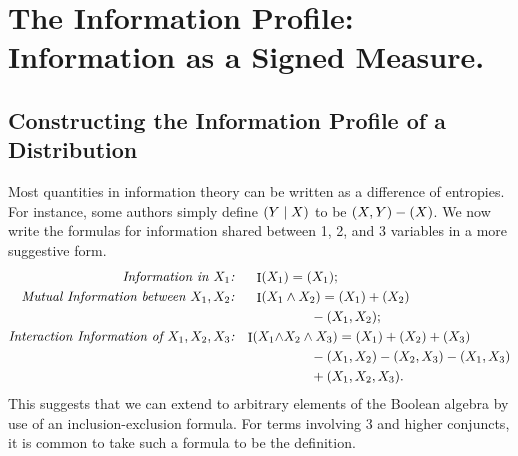 \documentclass{article}
\theoremstyle{plain}
\theoremstyle{definition}
\theoremstyle{remark}
\let\H\relax
\DeclareMathOperator{\H}{\mathrm{H}} %
\DeclareMathOperator{\I}{\mathrm{I}} %
\begin{document}
	
	\section{The Information Profile: Information as a Signed Measure.}
	
	

	


	\subsection{Constructing the Information Profile of a Distribution}
		
	Most quantities in information theory can be written as a difference of entropies.
	For instance, some authors simply define $\H(Y \mid X)$ to be $\H(X,Y) - \H(X)$.
	We now write the formulas for information shared between 1, 2, and 3 variables in a more suggestive form.
	\begin{align*}
		\textit{Information in $X_1$:}  && \I(X_1 &) = \H(X_1) ;\\
		\textit{Mutual Information between $X_1, X_2$:} && \I(X_1 &\land X_2) = \H(X_1) + \H(X_2)  \\
			 &&&\qquad - \H(X_1, X_2); \\
		 \textit{Interaction Information of $X_1, X_2, X_3$:}&&\I(X_1 \land &X_2 \land X_3) = \H(X_1) + \H(X_2) + \H(X_3) \\
			&&&\qquad - \H(X_1, X_2) - \H(X_2, X_3) - \H(X_1, X_3) \\
			&&&\qquad  + \H(X_1, X_2, X_3)  .\\
	\end{align*}
	This suggests that we can extend to arbitrary elements of the Boolean algebra by use of an inclusion-exclusion formula. For terms involving 3 and higher conjuncts, it is common to take such a formula to be the definition. 
\end{document}
